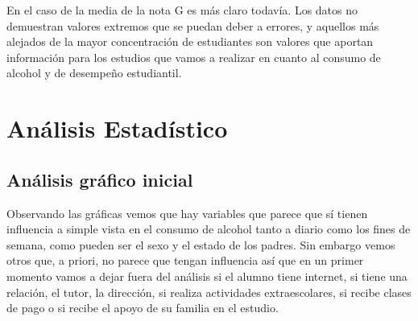 \documentclass[12pt,a4paper]{article}
\begin{document}
En el caso de la media de la nota G es más claro todavía. Los datos no demuestran valores extremos que se puedan deber a errores, y aquellos más alejados de la mayor concentración de estudiantes son valores que aportan información para los estudios que vamos a realizar en cuanto al consumo de alcohol y de desempeño estudiantil.


\section{Análisis Estadístico}
\subsection{Análisis gráfico inicial}
Observando las gráficas vemos que hay variables que parece que sí tienen influencia a simple vista en el consumo de alcohol tanto a diario como los fines de semana, como pueden ser el sexo y el estado de los padres. Sin embargo vemos otros que, a priori, no parece que tengan influencia así que en un primer momento vamos a dejar fuera del análisis si el alumno tiene internet, si tiene una relación, el tutor, la dirección, si realiza actividades extraescolares, si recibe clases de pago o si  recibe el apoyo de su familia en el estudio. 
\end{document}
